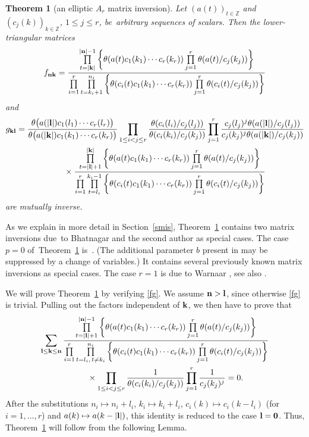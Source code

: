 \documentclass[pdftex]{sigma}%
\numberwithin{equation}{section}
\newtheorem{Theorem}{Theorem}[section]
\begin{document}
\begin{Theorem}[an elliptic $A_r$ matrix inversion]\label{amit}
Let
$(a(t))_{t\in\mathbb Z}$ and $(c_j(k))_{k\in\mathbb
Z}$, $1\leq j\leq r$,
 be~arbitrary sequences of scalars. Then the
lower-triangular matrices
\begin{gather*}
f_{\bf nk}=\frac{\prod\limits_{t=|{\bf k}|}^{|{\bf n}|-1}\bigg\{
\theta(a(t)c_1(k_1)\dotsm
c_r(k_r))\prod\limits_{j=1}^r\theta(a(t)/c_j(k_j))\bigg\}}
{\prod\limits_{i=1}^r\prod\limits_{t=k_i+1}^{n_i}\bigg\{\theta(c_i(t)c_1(k_1)\dotsm
c_r(k_r))\prod\limits_{j=1}^r\theta(c_i(t)/c_j(k_j))\bigg\}}
\end{gather*}
and
\begin{gather*}
g_{\bf kl}=
\frac{\theta\big(a({|{\bf l}|)}c_1(l_1)\dotsm c_r(l_r)\big)}
{\theta\big(a({|{\bf k}|})c_1(k_1)\dotsm c_r(k_r)\big)}
\prod\limits_{1\leq i<j\leq r}\frac{\theta(c_i(l_i)/c_j(l_j))}
{\theta(c_i(k_i)/c_j(k_j))}
\prod\limits_{j=1}^r\frac{c_j(l_j)^j\theta(a({|{\bf l}|})/c_j(l_j))}
{c_j(k_j)^j\theta(a({|{\bf k}|})/c_j(k_j))}
\\ \phantom{g_{\bf kl}=}{}
\times\frac{\prod\limits_{t=|{\bf l}|+1}^{|{\bf k}|}\bigg\{
\theta(a(t)c_1(k_1)\dotsm c_r(k_r))\prod\limits_{j=1}^r\theta(a(t)/c_j(k_j))\bigg\}}
{\prod\limits_{i=1}^r\prod\limits_{t=l_i}^{k_i-1}\bigg\{\theta(c_i(t)c_1(k_1)\dotsm
c_r(k_r))\prod\limits_{j=1}^r\theta(c_i(t)/c_j(k_j))\bigg\}}
\end{gather*}
are mutually inverse.
\end{Theorem}




As we explain in more detail in Section~\ref{smis}, Theorem~\ref{amit}
contains two matrix inversions due~to Bhatnagar and the second author \cite{bs} as special cases.
The case $p=0$ of~Theorem~\ref{amit} is~\cite[Theorem~3.1]{s}. (The additional
parameter $b$ present in \cite{s} may be
 suppressed by a change of variables.) It contains several previously
known matrix inversions \cite{bm,lm,m,ml} as special cases.
The case $r=1$ is due to Warnaar \cite[Lemma
3.2]{w}, see also \cite{rs}.

We will prove Theorem~\ref{amit} by verifying \eqref{fg}.
We assume
${\bf n}>{\bf l}$, since otherwise \eqref{fg} is trivial. Pulling out the factors independent of ${\bf k}$, we then have to prove that
\begin{gather*}
\sum_{\bf l\leq k\leq n}\frac{\prod\limits_{t=|{\bf l}|+1}^{|{\bf n}|-1}\bigg\{
\theta(a(t)c_1(k_1)\dotsm
c_r(k_r))\prod\limits_{j=1}^r\theta(a(t)/c_j(k_j))\bigg\}}
{\prod\limits_{i=1}^r\prod\limits_{t=l_i,\,t\neq k_i}^{n_i}\bigg\{\theta(c_i(t)c_1(k_1)\dotsm
c_r(k_r))\prod\limits_{j=1}^r\theta(c_i(t)/c_j(k_j))\bigg\}}
\\ \phantom{\sum_{\bf l\leq k\leq n}}{}
\times\prod\limits_{1\leq i<j\leq r}\frac{1}{\theta(c_i(k_i)/c_j(k_j))}
\prod\limits_{j=1}^r\frac{1}{c_j(k_j)^j}=0.
\end{gather*}
After the substitutions $n_i\mapsto n_i+l_i$, $k_i\mapsto k_i+l_i$, $c_i(k)\mapsto c_i(k-l_i)$ (for $i=1,\dots,r$) and $a(k)\mapsto a(k-|\bf l|)$,
this identity is reduced to the case
 ${\bf l}=\bf 0$. Thus, Theorem~\ref{amit} will
 follow from the following Lemma.
\end{document}
